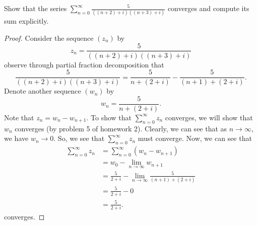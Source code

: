 \documentclass[a4paper]{article}
\begin{document}
\begin{problem}
    Show that the series \( \displaystyle \sum_{ n=0 }^{ \infty  } \frac{ 5  }{  ((n+2) + i) ((n+3) + i) }   \) converges and compute its sum explicitly.
\end{problem}
\begin{proof}
    Consider the sequence \( ({z}_{n}) \) by
    \[  {z}_{n} = \frac{ 5  }{ ((n+2) + i)((n+3) + i) } \]
    observe through partial fraction decomposition that 
    \[  \frac{ 5  }{  ((n+2) + i)((n+3) +i) } = \frac{ 5  }{ n + (2+i) } - \frac{ 5 }{ (n+1) + (2+i) }.  \]
    Denote another sequence \( ({w}_{n}) \) by
    \[  {w}_{n} = \frac{ 5  }{  n + (2+i) }.  \]
    Note that \( {z}_{n} = {w}_{n} - {w}_{n+1} \). 
    To show that \( \sum_{ n=0 }^{ \infty   } {z}_{n} \) converges, we will show that \( {w}_{n} \) converges (by problem 5 of homework 2). Clearly, we can see that as \( n \to \infty  \), we have \( {w}_{n} \to 0  \). So, we see that       \( \sum_{ n=0 }^{ \infty  } {z}_{n} \) must converge. Now, we can see that 
    \begin{align*}
        \sum_{ n=0  }^{ \infty  } {z}_{n} &= \sum_{ n=0  }^{ \infty  } ({w}_{n} - {w}_{n+1}) \\
                                          &= {w}_{0} - \lim_{ n \to \infty  }  {w}_{n+1} \\
                                          &= \frac{ 5 }{ 2 + i  } - \lim_{ n \to \infty  } \frac{ 5 }{ (n+1) + (2+i) } \\
                                          &= \frac{ 5  }{  2 + i }  - 0 \\
                                          &= \frac{ 5  }{ 2 + i  }.
\end{align*}
    converges.
\end{proof}
\end{document}

